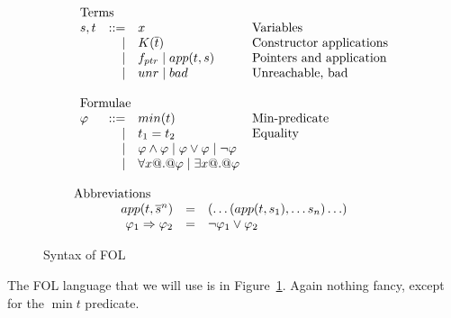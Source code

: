 \documentclass[preprint]{sigplanconf}
\begin{document}
\begin{figure}
\[\begin{array}{c}
\begin{array}{lrll}
\multicolumn{3}{l}{\text{Terms}} \\
  s,t & ::=  & x                          & \text{Variables} \\
      & \mid & K(\ol{t})                  & \text{Constructor applications} \\
      & \mid & f_{ptr} \mid app(t,s)       & \text{Pointers and application} \\
      & \mid & \unr \mid \bad             & \text{Unreachable, bad} \\ \\
\multicolumn{3}{l}{\text{Formulae}} \\
 \phi & ::=  & min(t)    & \text{Min-predicate} \\
      & \mid & t_1 = t_2  & \text{Equality} \\
      & \mid & \phi \land \phi \mid \phi \lor \phi \mid \neg \phi \\
      & \mid & \forall x @.@ \phi \mid \exists x @.@ \phi \\ \\
\end{array}
\\
\multicolumn{1}{l}{\text{Abbreviations}} \\
\begin{array}{rcl}
app(t,\oln{s}{n}) & = & (\ldots(app(t,s_1),\ldots s_n)\ldots) \\
\phi_1 \Rightarrow \phi_2 & = & \neg \phi_1 \lor \phi_2
\end{array}
\end{array}\]
\caption{Syntax of FOL}\label{fig:fol-image}
\end{figure}

The FOL language that we will use is in Figure~\ref{fig:fol-image}. 
Again nothing fancy, except for the $\min{t}$ predicate.
\end{document}
